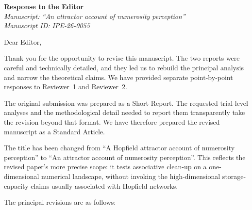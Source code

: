 \documentclass[11pt]{article}
\begin{document}
\begin{center}
{\Large\bfseries Response to the Editor}\\[0.5em]
{\itshape Manuscript: ``An attractor account of numerosity perception''}\\[0.25em]
{\itshape Manuscript ID: IPE-26-0055}
\end{center}

Dear Editor,

Thank you for the opportunity to revise this manuscript. The two reports were careful and technically detailed, and they led us to rebuild the principal analysis and narrow the theoretical claims. We have provided separate point-by-point responses to Reviewer~1 and Reviewer~2.

The original submission was prepared as a Short Report. The requested trial-level analyses and the methodological detail needed to report them transparently take the revision beyond that format. We have therefore prepared the revised manuscript as a Standard Article.

The title has been changed from ``A Hopfield attractor account of numerosity perception'' to ``An attractor account of numerosity perception''. This reflects the revised paper's more precise scope: it tests associative clean-up on a one-dimensional numerical landscape, without invoking the high-dimensional storage-capacity claims usually associated with Hopfield networks.

The principal revisions are as follows:
\end{document}
